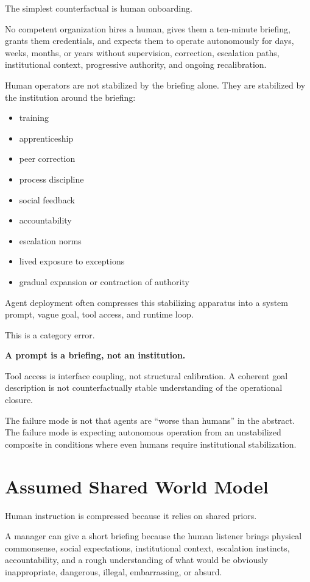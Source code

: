 \documentclass[11pt]{article}
\begin{document}
The simplest counterfactual is human onboarding.

No competent organization hires a human, gives them a ten-minute briefing, grants them credentials, and expects them to operate autonomously for days, weeks, months, or years without supervision, correction, escalation paths, institutional context, progressive authority, and ongoing recalibration.

Human operators are not stabilized by the briefing alone. They are stabilized by the institution around the briefing:
\begin{itemize}
\item training
\item apprenticeship
\item peer correction
\item process discipline
\item social feedback
\item accountability
\item escalation norms
\item lived exposure to exceptions
\item gradual expansion or contraction of authority
\end{itemize}

Agent deployment often compresses this stabilizing apparatus into a system prompt, vague goal, tool access, and runtime loop.

This is a category error.

\begin{pullquote}
\textbf{A prompt is a briefing, not an institution.}
\end{pullquote}

Tool access is interface coupling, not structural calibration. A coherent goal description is not counterfactually stable understanding of the operational closure.

The failure mode is not that agents are ``worse than humans'' in the abstract. The failure mode is expecting autonomous operation from an unstabilized composite in conditions where even humans require institutional stabilization.

\section{Assumed Shared World Model}

Human instruction is compressed because it relies on shared priors.

A manager can give a short briefing because the human listener brings physical commonsense, social expectations, institutional context, escalation instincts, accountability, and a rough understanding of what would be obviously inappropriate, dangerous, illegal, embarrassing, or absurd.
\end{document}
